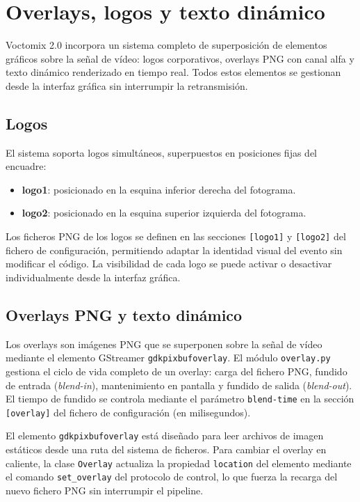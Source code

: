 \section{Overlays, logos y texto dinámico}
\label{sec:overlays}

Voctomix 2.0 incorpora un sistema completo de superposición de elementos gráficos
sobre la señal de vídeo: logos corporativos, overlays PNG con canal alfa y texto
dinámico renderizado en tiempo real. Todos estos elementos se gestionan desde la
interfaz gráfica sin interrumpir la retransmisión.

\subsection{Logos}

El sistema soporta logos simultáneos, superpuestos en posiciones fijas del encuadre:

\begin{itemize}
  \item \textbf{logo1}: posicionado en la esquina inferior derecha del fotograma.
  \item \textbf{logo2}: posicionado en la esquina superior izquierda del fotograma.
\end{itemize}

Los ficheros PNG de los logos se definen en las secciones \texttt{[logo1]} y
\texttt{[logo2]} del fichero de configuración, permitiendo adaptar la identidad visual
del evento sin modificar el código. La visibilidad de cada logo se puede activar o
desactivar individualmente desde la interfaz gráfica.

\subsection{Overlays PNG y texto dinámico}

Los overlays son imágenes PNG que se superponen sobre la señal de vídeo
mediante el elemento GStreamer \texttt{gdkpixbufoverlay}. El módulo
\texttt{overlay.py} gestiona el ciclo de vida completo de un overlay:
carga del fichero PNG, fundido de entrada (\textit{blend-in}), mantenimiento en
pantalla y fundido de salida (\textit{blend-out}). El tiempo de fundido se controla
mediante el parámetro \texttt{blend-time} en la sección \texttt{[overlay]} del
fichero de configuración (en milisegundos).

El elemento \texttt{gdkpixbufoverlay} está diseñado para leer archivos de imagen
estáticos desde una ruta del sistema de ficheros. Para cambiar el overlay en caliente,
la clase \texttt{Overlay} actualiza la propiedad \texttt{location} del elemento mediante
el comando \texttt{set\_overlay} del protocolo de control, lo que fuerza la recarga del
nuevo fichero PNG sin interrumpir el pipeline.

